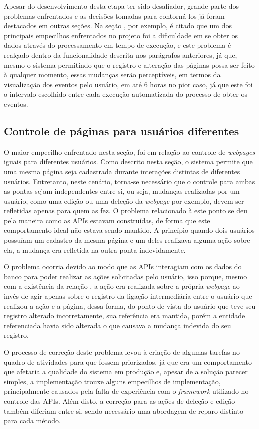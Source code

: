 Apesar do desenvolvimento desta etapa ter sido desafiador, grande parte dos
problemas enfrentados e as decisões tomadas para contorná-los já foram
destacados em outras seções. Na seção , por
exemplo, é citado que um dos principais empecilhos enfrentados no projeto foi a
dificuldade em se obter os dados através do processamento em tempo de execução,
e este problema é realçado dentro da funcionalidade descrita nos parágrafos
anteriores, já que, mesmo o sistema permitindo que o registro e alteração das
páginas possa ser feito à qualquer momento, essas mudanças serão perceptíveis,
em termos da visualização dos eventos pelo usuário, em até 6 horas no pior
caso, já que este foi o intervalo escolhido entre cada execução automatizada do
processo de obter os eventos.

\subsection{Controle de páginas para usuários diferentes}

O maior empecilho enfrentado nesta seção, foi em relação ao controle de
\textit{webpages} iguais para diferentes usuários. Como descrito nesta seção, o
sistema permite que uma mesma página seja cadastrada durante interações
distintas de diferentes usuários. Entretanto, neste cenário, torna-se
necessário que o controle para ambas as pontas sejam independentes entre si, ou
seja, mudanças realizadas por um usuário, como uma edição ou uma deleção da
\textit{webpage} por exemplo, devem ser refletidas apenas para quem as fez. O
problema relacionado à este ponto se deu pela maneira como as \acp{API} estavam
construídas, de forma que este comportamento ideal não estava sendo mantido. A
princípio quando dois usuários possuíam um cadastro da mesma página e um deles
realizava alguma ação sobre ela, a mudança era refletida na outra ponta
indevidamente.

O problema ocorria devido ao modo que as \acp{API} interagiam com os dados do
banco para poder realizar as ações solicitadas pelo usuário, isso porque, mesmo
com a existência da relação , a ação era realizada
sobre a própria \textit{webpage} ao invés de agir apenas sobre o registro da
ligação intermediária entre o usuário que realizou a ação e a página, dessa
forma, do ponto de vista do usuário que teve seu registro alterado
incorretamente, sua referência era mantida, porém a entidade referenciada havia
sido alterada o que causava a mudança indevida do seu registro.

O processo de correção deste problema levou à criação de algumas tarefas no
quadro de atividades para que fossem priorizados, já que era um comportamento
que afetaria a qualidade do sistema em produção e, apesar de a solução parecer
simples, a implementação trouxe alguns empecilhos de implementação,
principalmente causados pela falta de experiência com o \textit{framework}
utilizado no controle das \acp{API}. Além disto, a correção para as ações de
deleção e edição também diferiam entre si, sendo necessário uma abordagem de
reparo distinto para cada método.

